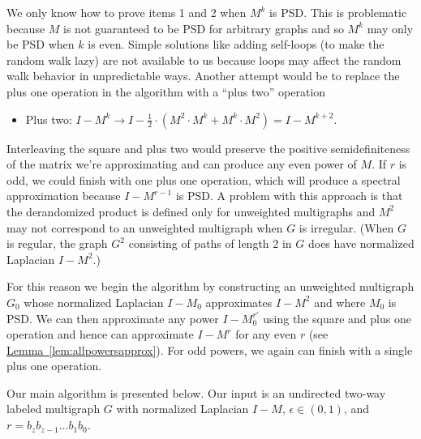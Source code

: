 \documentclass[11pt]{article}
\numberwithin{equation}{section}
\theoremstyle{definition}
\theoremstyle{plain}
\newcommand{\expref}[2]{\hyperref[#2]{#1~\ref{#2}}}
\numberwithin{myalgctr}{section}
\theoremstyle{named}
\begin{document}
We only know how to prove items 1 and 2 when $M^k$ is PSD. This is problematic because $M$ is not guaranteed to be PSD for arbitrary graphs and so $M^{k}$ may only be PSD when $k$ is even. Simple solutions like adding self-loops (to make the random walk lazy) are not available to us because loops may affect the random walk behavior in unpredictable ways. Another attempt would be to replace the plus one operation in the algorithm with a ``plus two'' operation
\begin{itemize}
\item Plus two: $I-M^{k} \rightarrow I-\frac{1}{2}\cdot (M^2\cdot M^{k}+ M^{k}\cdot M^2) = I-M^{k+2}$.
\end{itemize}
Interleaving the square and plus two would preserve the positive semidefiniteness of the matrix we're approximating and can produce any even power of $M$. If $r$ is odd, we could finish with one plus one operation, which will produce a spectral approximation because $I-M^{r-1}$ is PSD. A problem with this approach is that the derandomized product is defined only for unweighted multigraphs and $M^2$ may not correspond to an unweighted multigraph when $G$ is irregular. (When $G$ is regular, the graph $G^2$ consisting of paths of length 2 in $G$ does have normalized Laplacian $I-M^2$.)

For this reason we begin the algorithm by constructing an unweighted multigraph $G_0$ whose normalized Laplacian $I-M_0$ approximates $I-M^2$ and where $M_0$ is PSD. We can then approximate any power $I-M_0^{r'}$ using the square and plus one operation and hence can approximate $I-M^r$ for any even $r$ (see \expref{Lemma}{lem:allpowersapprox}). For odd powers, we again can finish with a single plus one operation. 

Our main algorithm is presented below. Our input is an undirected two-way labeled multigraph $G$ with normalized Laplacian $I-M$, $\epsilon\in(0,1)$, and $r=b_zb_{z-1}\ldots b_1b_0$.
\end{document}
